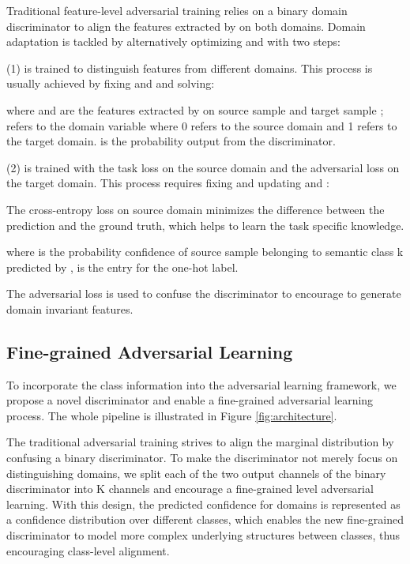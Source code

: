 \documentclass[runningheads]{llncs}
\begin{document}
Traditional feature-level adversarial training relies on a binary domain discriminator  to align the features extracted by  on both domains. Domain adaptation is tackled by alternatively optimizing  and  with two steps:

(1)  is trained to distinguish features from different domains. This process is usually achieved by fixing  and  and solving:




where  and  are the features extracted by  on source sample  and target sample ;  refers to the domain variable where 0 refers to the source domain and 1 refers to the target domain.  is the probability output from the discriminator.



(2)  is trained with the task loss  on the source domain and the adversarial loss  on the target domain. This process requires fixing  and updating  and :





The cross-entropy loss  on source domain minimizes the difference between the prediction and the ground truth, which helps  to learn the task specific knowledge.

where  is the probability confidence of source sample  belonging to semantic class k predicted by ,  is the entry for the one-hot label.

The adversarial loss  is used to confuse the discriminator to encourage  to generate domain invariant features.
















\subsection{Fine-grained Adversarial Learning}
To incorporate the class information into the adversarial learning framework, we propose a novel discriminator and enable a fine-grained adversarial learning process. The whole pipeline is illustrated in Figure \ref{fig:architecture}.


The traditional adversarial training strives to align the marginal distribution by confusing a binary discriminator. To make the discriminator not merely focus on distinguishing domains, we split each of the two output channels of the binary discriminator into K channels and encourage a fine-grained level adversarial learning. With this design, the predicted confidence for domains is represented as a confidence distribution over different classes, which enables the new fine-grained discriminator to model more complex underlying structures between classes, thus encouraging class-level alignment.
\end{document}
